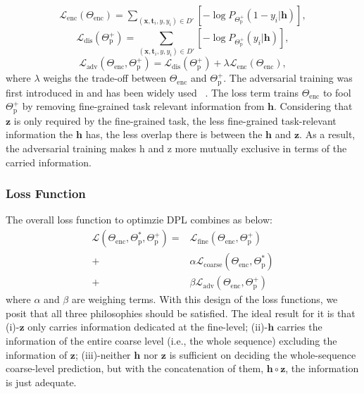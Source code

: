 \documentclass[11pt]{article}
\newcommand{\bx}{\mathbf{x}}
\newcommand{\bt}{\mathbf{t}}
\newcommand{\bz}{\mathbf{z}}
\newcommand{\bh}{\mathbf{h}}
\newcommand{\mL}{\mathcal{L}}
\begin{document}
\begin{equation}
\begin{aligned}
    \mL_{\text{enc}}(\Theta_{\text{enc}}) = 
\sum_{(\bx, \bt_i, y, y_i) \in D'} [-\log P_{\Theta^+_{\text{p}}}(1-y_i|\bh)],
    \label{eq:adv-1}
\end{aligned}
\end{equation}
\begin{equation}
    \mL_{\text{dis}}(\Theta^+_{\text{p}}) = 
\sum_{(\bx, \bt_i, y, y_i) \in D'} [-\log P_{\Theta^+_{\text{p}}}(y_i|\bh)],
    \label{eq:adv-2}
\end{equation}
\begin{equation}
    \mL_{\text{adv}}(\Theta_{\text{enc}},\Theta^+_{\text{p}}) = \mL_{\text{dis}}(\Theta^+_{\text{p}}) + \lambda \mL_{\text{enc}}(\Theta_{\text{enc}}),
    \label{eq:adv-3}
\end{equation}
where $\lambda$ weighs the trade-off between $\Theta_{\text{enc}}$ and $\Theta^+_{\text{p}}$.
The adversarial training was first introduced in \citet{lample2017fader} and has been widely used ~\cite{zhao2018adversarially,fu2018style,shen2017style,melnyk2017improved}.
The loss term trains $\Theta_{\text{enc}}$ to fool $\Theta^+_{\text{p}}$ by removing fine-grained task relevant information from $\bh$.
Considering that $\bz$ is only required by the fine-grained task, the less fine-grained task-relevant information the $\bh$ has, the less overlap there is between the $\bh$ and $\bz$.
As a result, the adversarial training makes h and z more mutually exclusive in terms of the carried information.


\subsubsection{Loss Function}
The overall loss function to optimzie DPL combines as below:
\begin{equation}
\begin{aligned}
    \mL(\Theta_{\text{enc}}, \Theta^*_{\text{p}}, \Theta^+_{\text{p}}) = &\mL_{\text{fine}}(\Theta_{\text{enc}}, \Theta^+_{\text{p}})\\ + 
    &\alpha \mL_{\text{coarse}}(\Theta_{\text{enc}}, \Theta^*_{\text{p}})\\ + 
    &\beta \mL_{\text{adv}}(\Theta_{\text{enc}}, \Theta^+_{\text{p}})
\end{aligned}
\end{equation}
where $\alpha$ and $\beta$ are weighing terms.
With this design of the loss functions, we posit that all three philosophies should be satisfied. The ideal result for it is that (i)-$\bz$ only carries information dedicated at the fine-level; (ii)-$\bh$ carries the information of the entire coarse level (i.e., the whole sequence) excluding the information of $\bz$; (iii)-neither $\bh$ nor $\bz$ is sufficient on deciding the whole-sequence coarse-level prediction, but with the concatenation of them, $\bh \circ \bz$, the information is just adequate.
\end{document}
